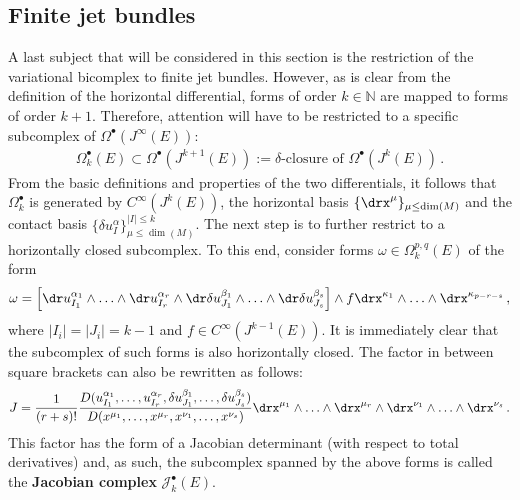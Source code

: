 \subsection{Finite jet bundles}

    A last subject that will be considered in this section is the restriction of the variational bicomplex to finite jet bundles. However, as is clear from the definition of the horizontal differential, forms of order $k\in\mathbb{N}$ are mapped to forms of order $k+1$. Therefore, attention will have to be restricted to a specific subcomplex of $\Omega^\bullet(J^\infty(E))$:
    \begin{gather}
        \Omega^\bullet_k(E)\subset\Omega^\bullet(J^{k+1}(E)) := \delta\text{-closure of }\Omega^\bullet(J^k(E))\,.
    \end{gather}
    From the basic definitions and properties of the two differentials, it follows that $\Omega^\bullet_k$ is generated by $C^\infty(J^k(E))$, the horizontal basis $\{\drx^\mu\}_{\mu\leq\dim(M)}$ and the contact basis $\{\delta u^\alpha_I\}_{\mu\leq\dim(M)}^{|I|\leq k}$.
    The next step is to further restrict to a horizontally closed subcomplex. To this end, consider forms $\omega\in\Omega^{p,q}_k(E)$ of the form
    \begin{gather}
        \omega = \left[\dr u^{\alpha_1}_{I_1}\wedge\ldots\wedge \dr u^{\alpha_r}_{I_r}\wedge\dr\delta u^{\beta_1}_{J_1}\wedge\ldots\wedge\dr\delta u^{\beta_s}_{J_s}\right]\wedge f\drx^{\kappa_1}\wedge\ldots\wedge \drx^{\kappa_{p-r-s}}\,,
    \end{gather}
    where $|I_i|=|J_i|=k-1$ and $f\in C^\infty(J^{k-1}(E))$. It is immediately clear that the subcomplex of such forms is also horizontally closed. The factor in between square brackets can also be rewritten as follows:
    \begin{gather}
        J = \frac{1}{(r+s)!}\frac{D(u^{\alpha_1}_{I_1},\ldots,u^{\alpha_r}_{I_r},\delta u^{\beta_1}_{J_1},\ldots,\delta u^{\beta_s}_{J_s})}{D(x^{\mu_1},\ldots,x^{\mu_r},x^{\nu_1},\ldots,x^{\nu_s})}\drx^{\mu_1}\wedge\ldots\wedge\drx^{\mu_r}\wedge\drx^{\nu_1}\wedge\ldots\wedge\drx^{\nu_s}\,.
    \end{gather}
    This factor has the form of a Jacobian determinant (with respect to total derivatives) and, as such, the subcomplex spanned by the above forms is called the \textbf{Jacobian complex} $\mathcal{J}^\bullet_k(E)$.

